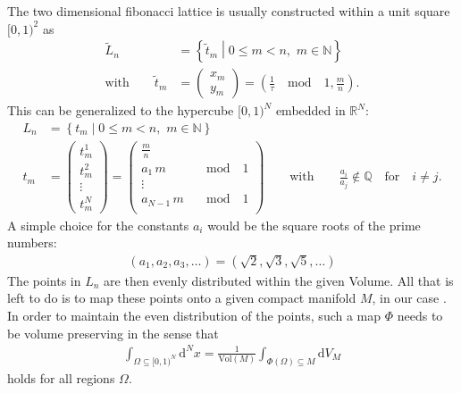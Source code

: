 \noindent The two dimensional fibonacci lattice is usually constructed within a unit square $[0,1)^2$ as
\begin{align*}
 \tilde{L}_n                      & = \left\{ \tilde{t}_m \middle| 0 \le m < n, \, \, m \in \mathbb{N} \right\}                                    \\
 \textrm{with} \qquad \tilde{t}_m & = \begin{pmatrix}x_m\\y_m\end{pmatrix} = \left(\frac{1}{\tau} \quad \mathrm{mod} \quad 1, \frac{m}{n} \right) \textrm{.}
\end{align*}
\noindent This can be generalized to the hypercube $[0,1)^N$ embedded in $\mathbb{R}^N$:
\begin{align*}
 L_n & = \left\{ t_m \middle| 0 \le m < n, \, \, m \in \mathbb{N} \right\}                                                                                       \\
 t_m & = \begin{pmatrix} t_m^1 \\ t_m^2 \\ \vdots \\ t_m^N \end{pmatrix} = \begin{pmatrix}
  \frac{m}{n}        &                      \\
  a_1 \, m \quad     & \mathrm{mod} \quad 1 \\
  \vdots             &                      \\
  a_{N-1} \, m \quad & \mathrm{mod} \quad 1 \\
 \end{pmatrix} \qquad \textrm{with} \qquad \frac{a_i}{a_j} \notin \mathbb{Q} \quad \textrm{for} \quad i \neq j \textrm{.}
\end{align*}
A simple choice for the constants $a_i$ would be the square roots of the prime numbers:
\begin{align*}
 (a_1, a_2 ,a_3, \dots) = (\sqrt{2}, \sqrt{3}, \sqrt{5}, \dots)
\end{align*}
The points in $L_n$ are then evenly distributed within the given Volume. All that is left to do is to map these points onto a given compact manifold $M$, in our case \SUTwo. In order to maintain the even distribution of the points, such a map $\Phi$ needs to be volume preserving in the sense that
\begin{align}
 \int_{\Omega \subseteq [0,1)^N} \mathrm{d}^N x = \frac{1}{\mathrm{Vol}(M)} \int_{\Phi(\Omega) \subseteq M} \mathrm{d}V_M
 \label{eq:fibAreaPres}
\end{align}
holds for all regions $\Omega$.

